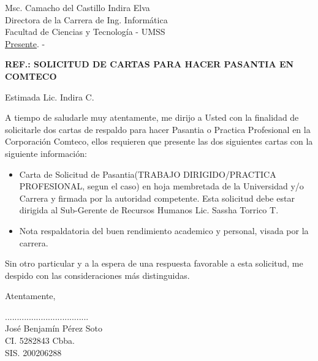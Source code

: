 \documentclass[letterpaper,12pt]{letter}
\begin{document}
\date {2 de marzo de 2012}
\begin{letter}{Msc. Camacho del Castillo Indira Elva \\ Directora de la Carrera de Ing. Inform\'atica \\ Facultad de Ciencias y Tecnolog\'ia - UMSS \\ \underline {Presente}. -}

\begin{center}
	\opening{\textbf{REF.: SOLICITUD DE CARTAS PARA HACER PASANTIA EN COMTECO}}
\end{center}

Estimada Lic. Indira C.

A tiempo de saludarle muy atentamente, me dirijo a Usted con la finalidad de solicitarle dos cartas de 
respaldo para hacer Pasantia o Practica Profesional en la Corporación Comteco, ellos requieren que 
presente las dos siguientes cartas con la siguiente informaci\'on:

\begin{itemize}
    \item Carta de Solicitud de Pasantia(TRABAJO DIRIGIDO/PRACTICA PROFESIONAL, segun el caso) en hoja 
    membretada de la Universidad y/o Carrera y firmada por la autoridad competente. Esta solicitud debe 
    estar dirigida al Sub-Gerente de Recursos Humanos Lic. Sassha Torrico T.

    \item Nota respaldatoria del buen rendimiento academico y personal, visada por la carrera.
\end{itemize}

Sin otro particular y a la espera de una respuesta favorable a esta solicitud, me despido con las consideraciones más distinguidas.

Atentamente,

\vspace{1.7cm}

\begin{center}
...................................\\
Jos\'e Benjam\'in P\'erez Soto\\
CI. 5282843 Cbba. \\
SIS. 200206288
\end{center}

\end{letter}
\end{document}
